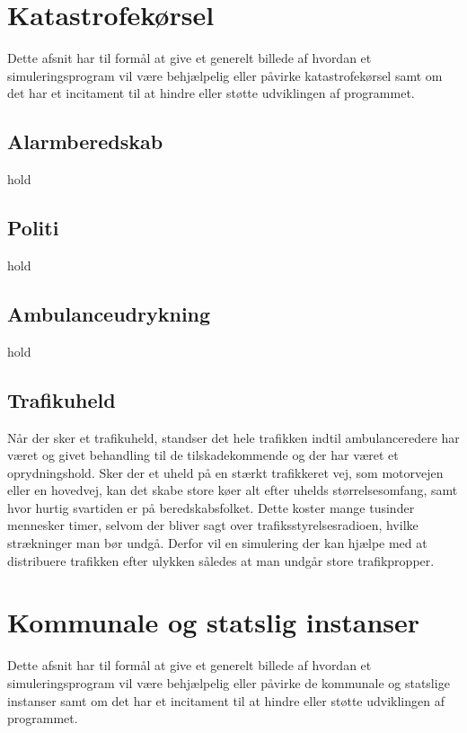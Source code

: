 \section{Katastrofekørsel}\label{Katastrofekoersel}

Dette afsnit har til formål at give et generelt billede af hvordan et simuleringsprogram vil være behjælpelig eller påvirke katastrofekørsel samt om det har et incitament til at hindre eller støtte udviklingen af programmet.

\subsection{Alarmberedskab}\label{Alarmberedskab}

hold

\subsection{Politi}\label{Politi}

hold

\subsection{Ambulanceudrykning}\label{Ambulanceudrykning}

hold

\subsection{Trafikuheld}\label{Trafikuheld}

Når der sker et trafikuheld, standser det hele trafikken indtil ambulanceredere har været og givet behandling til de tilskadekommende og der har været et oprydningshold. Sker der et uheld på en stærkt trafikkeret vej, som motorvejen eller en hovedvej, kan det skabe store køer alt efter uhelds størrelsesomfang, samt hvor hurtig svartiden er på beredskabsfolket. Dette koster mange tusinder mennesker timer, selvom der bliver sagt over trafiksstyrelsesradioen, hvilke strækninger man bør undgå. Derfor vil en simulering der kan hjælpe med at distribuere trafikken efter ulykken således at man undgår store trafikpropper.

\section{Kommunale og statslig instanser}\label{Kommunale-og-statslige-instanser}

Dette afsnit har til formål at give et generelt billede af hvordan et simuleringsprogram vil være behjælpelig eller påvirke de kommunale og statslige instanser samt om det har et incitament til at hindre eller støtte udviklingen af programmet.

